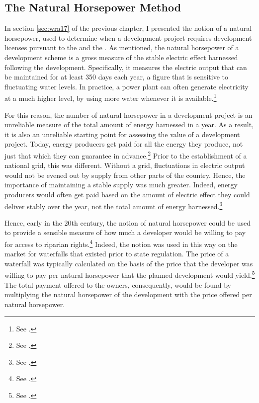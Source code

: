 \subsection{The Natural Horsepower Method}\label{sec:5:4:1}

In section \ref{sec:wra17} of the previous chapter, I presented the notion of a natural horsepower, used to determine when a development project requires development licenses pursuant to the \cite{wra17} and the \cite{ica17}. As mentioned, the natural horsepower of a development scheme is a gross measure of the stable electric effect harnessed following the development. Specifically, it measures the electric output that can be maintained for at least 350 days each year, a figure that is sensitive to fluctuating water levels. In practice, a power plant can often generate electricity at a much higher level, by using more water whenever it is available.\footnote{See \cite{sofienlund07}.}

For this reason, the number of natural horsepower in a development project is an unreliable measure of the total amount of energy harnessed in a year. As a result, it is also an unreliable starting point for assessing the value of a development project. Today, energy producers get paid for all the energy they produce, not just that which they can guarantee in advance.\footnote{See \cite[83-84]{uleberg08}.} Prior to the establishment of a national grid, this was different. Without a grid, fluctuations in electric output would not be evened out by supply from other parts of the country. Hence, the importance of maintaining a stable supply was much greater. Indeed, energy producers would often get paid based on the amount of electric effect they could deliver stably over the year, not the total amount of energy harnessed.\footnote{See \cite[83]{uleberg08}.}

Hence, early in the 20th century, the notion of natural horsepower could be used to provide a sensible measure of how much a developer would be willing to pay for access to riparian rights.\footnote{See \cite[83]{uleberg08}.} Indeed, the notion was used in this way on the market for waterfalls that existed prior to state regulation. The price of a waterfall was typically calculated on the basis of the price that the developer was willing to pay per natural horsepower that the planned development would yield.\footnote{See \cite[83]{uleberg08}.} The total payment offered to the owners, consequently, would be found by multiplying the natural horsepower of the development with the price offered per natural horsepower.

